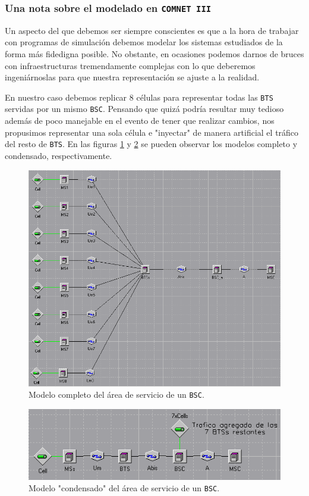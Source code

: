 \documentclass[10pt]{article}
\begin{document}
			\subsubsection{Una nota sobre el modelado en \texttt{COMNET III}}
				Un aspecto del que debemos ser siempre conscientes es que a la hora de trabajar con programas de simulación debemos modelar los sistemas estudiados de la forma más fidedigna posible. No obstante, en ocasiones podemos darnos de bruces con infraestructuras tremendamente complejas con lo que deberemos ingeniárnoslas para que nuestra representación se ajuste a la realidad.

				En nuestro caso debemos replicar $8$ células para representar todas las \texttt{BTS} servidas por un mismo \texttt{BSC}. Pensando que quizá podría resultar muy tedioso además de poco manejable en el evento de tener que realizar cambios, nos propusimos representar una sola célula e "inyectar" de manera artificial el tráfico del resto de \texttt{BTS}. En las figuras \ref{f:full_bsc_area} y \ref{f:condensed_bsc_area} se pueden observar los modelos completo y condensado, respectivamente.

				\begin{figure}
					\centering
					\includegraphics[width=0.5\linewidth]{full_bsc_area.png}
					\caption{Modelo completo del área de servicio de un \texttt{BSC}.}
					\label{f:full_bsc_area}
				\end{figure}

				\begin{figure}
					\centering
					\includegraphics[width=0.5\linewidth]{condensed_bsc_area.png}
					\caption{Modelo "condensado" del área de servicio de un \texttt{BSC}.}
					\label{f:condensed_bsc_area}
				\end{figure}
\end{document}
